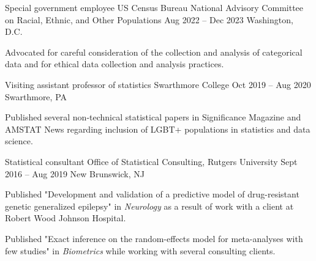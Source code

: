 \documentclass[letterpaper]{resume_config}
\begin{document}
\WorkExperience
    {Special government employee} %
    {US Census Bureau National Advisory Committee on Racial, Ethnic, and Other Populations} %
    {Aug 2022 -- Dec 2023} %
    {Washington, D.C.} %
    {
        \item Advocated for careful consideration of the collection and analysis of categorical data and for ethical data collection and analysis practices. 
    } 


\WorkExperience
    {Visiting assistant professor of statistics} %
    {Swarthmore College} %
    {Oct 2019 -- Aug 2020} %
    {Swarthmore, PA} %
    {
        \item Published several non-technical statistical papers in Significance Magazine and AMSTAT News regarding inclusion of LGBT+ populations in statistics and data science.
    } 


\WorkExperience
    {Statistical consultant} %
    {Office of Statistical Consulting, Rutgers University} %
    {Sept 2016 -- Aug 2019} %
    {New Brunswick, NJ} %
    {
        \item Published "Development and validation of a predictive model of drug-resistant genetic generalized epilepsy" in {\it Neurology} as a result of work with a client at Robert Wood Johnson Hospital. 
        \item Published "Exact inference on the random-effects model for meta-analyses with few studies" in {\it Biometrics} while working with several consulting clients. 
    } 
\end{document}
